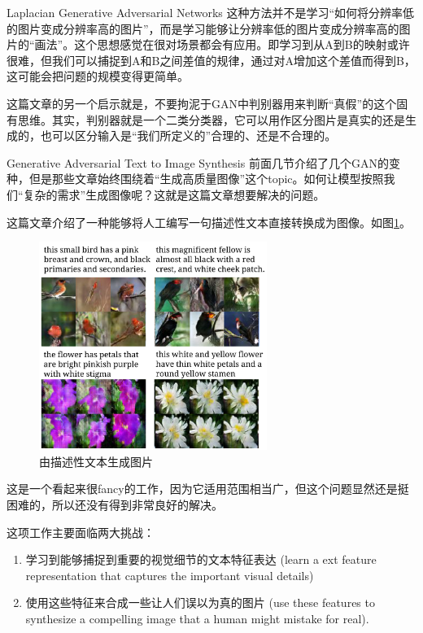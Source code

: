 \documentclass{ctexart}
\begin{document}
\begin{section}{Laplacian Generative Adversarial Networks}
		这种方法并不是学习“如何将分辨率低的图片变成分辨率高的图片”，而是学习能够让分辨率低的图片变成分辨率高的图片的“画法”。这个思想感觉在很对场景都会有应用。即学习到从A到B的映射或许很难，但我们可以捕捉到A和B之间差值的规律，通过对A增加这个差值而得到B，这可能会把问题的规模变得更简单。
		
		这篇文章的另一个启示就是，不要拘泥于GAN中判别器用来判断“真假”的这个固有思维。其实，判别器就是一个二类分类器，它可以用作区分图片是真实的还是生成的，也可以区分输入是“我们所定义的”合理的、还是不合理的。
		
	\end{section}


	\begin{section}{Generative Adversarial Text to Image Synthesis}
		前面几节介绍了几个GAN的变种，但是那些文章始终围绕着“生成高质量图像”这个topic。如何让模型按照我们“复杂的需求”生成图像呢？这就是这篇文章\cite{reed2016generative}想要解决的问题。
		
		这篇文章介绍了一种能够将人工编写一句描述性文本直接转换成为图像。如图\ref{fig:image-synthesis-exp}。
		
		\begin{figure}
			\centering
			\includegraphics[width=20em]{figures/image-synthesis-prelude-demo.png}
			\caption{由描述性文本生成图片}
			\label{fig:image-synthesis-exp}
		\end{figure}
	
		这是一个看起来很fancy的工作，因为它适用范围相当广，但这个问题显然还是挺困难的，所以还没有得到非常良好的解决。
		
		这项工作主要面临两大挑战：
		
		\begin{enumerate}
			\item 学习到能够捕捉到重要的视觉细节的文本特征表达 (learn a ext feature representation that captures the important visual details)
			\item 使用这些特征来合成一些让人们误以为真的图片 (use these features to synthesize a compelling image that a human might mistake for real).
		\end{enumerate}
		

\end{section}
\end{document}
